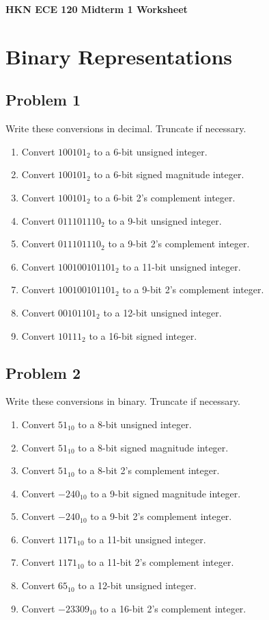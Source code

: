 \documentclass{article}
\begin{document}
\begin{center}
\textbf{
{\Large HKN ECE 120 Midterm 1 Worksheet}
}
\end{center} 
\noindent\makebox[\linewidth]{\rule{\linewidth}{0.2pt}}


\section*{Binary Representations}
\subsection*{Problem 1}
Write these conversions in decimal. Truncate if necessary.
\begin{enumerate}[label=\alph*.]
    \item Convert $100101_2$ to a 6-bit unsigned integer.
    \item Convert $100101_2$ to a 6-bit signed magnitude integer.
    \item Convert $100101_2$ to a 6-bit 2's complement integer.
    \item Convert $0 1110 1110_2$ to a 9-bit unsigned integer.
    \item Convert $0 1110 1110_2$ to a 9-bit 2's complement integer.
    \item Convert $1001 0010 1101_2$ to a 11-bit unsigned integer.
    \item Convert $1001 0010 1101_2$ to a 9-bit 2's complement integer.
    \item Convert $0010 1101_2$ to a 12-bit unsigned integer.
    \item Convert $1 0111_2$ to a 16-bit signed integer. 
\end{enumerate}

\subsection*{Problem 2}
Write these conversions in binary. Truncate if necessary.
\begin{enumerate}[label=\alph*.]
    \item Convert $51_{10}$ to a 8-bit unsigned integer.
    \item Convert $51_{10}$ to a 8-bit signed magnitude integer.
    \item Convert $51_{10}$ to a 8-bit 2's complement integer.
    \item Convert $-240_{10}$ to a 9-bit signed magnitude integer.
    \item Convert $-240_{10}$ to a 9-bit 2's complement integer.
    \item Convert $1171_{10}$ to a 11-bit unsigned integer.
    \item Convert $1171_{10}$ to a 11-bit 2's complement integer.
    \item Convert $65_{10}$ to a 12-bit unsigned integer.
    \item Convert $-23309_{10}$ to a 16-bit 2's complement integer. 
\end{enumerate}
\end{document}
